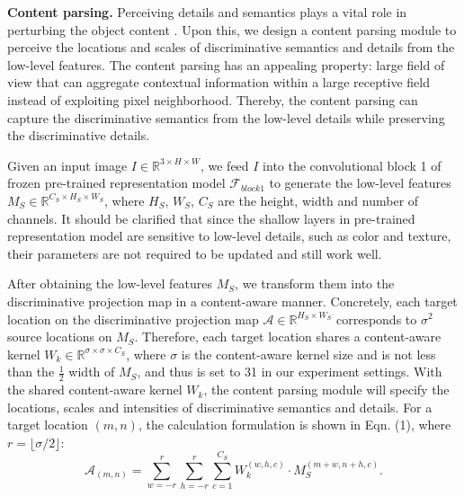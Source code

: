 \documentclass[letterpaper]{article} %
\begin{document}
\textbf{Content parsing.} Perceiving details and semantics plays a vital role in perturbing the object content \cite{DBLP:conf/mm/WangWLO20,DBLP:conf/aaai/WangLWO21, DBLP:conf/icmcs/WangWZLL19}. Upon this, we design a content parsing module to perceive the locations and scales of discriminative semantics and details from the low-level features. The content parsing has an appealing property: large field of view that can aggregate contextual information within a large receptive field instead of exploiting pixel neighborhood. Thereby, the content parsing can capture the discriminative semantics from the low-level details while preserving the discriminative details.


Given an input image $ I \in \mathbb{R}^{3\times H \times W} $, we  feed $ I $ into the convolutional block 1 of frozen pre-trained representation model $ \mathcal{F}_{block1} $ to generate the low-level features $ M_S \in\mathbb{R}^{C_S \times H_S \times W_S} $, where $ H_S $, $W_S $, $ C_S $ are the height, width and number of channels. It should be clarified that since the shallow layers in pre-trained representation model are sensitive to low-level details, such as color and texture, their parameters are not required to be updated and still work well.





After obtaining the low-level features $ M_S $, we transform them into the discriminative projection map in a content-aware manner. Concretely, each target location on the discriminative projection map $ \mathcal{A} \in \mathbb{R}^{H_S \times W_S} $ corresponds to $ \sigma^2 $ source locations on $ M_S $. Therefore, each target location shares a content-aware kernel $ W_k \in \mathbb{R}^{ \sigma \times \sigma \times C_S } $, where $ \sigma $ is the content-aware kernel size and is not less than the $ \frac{1}{2} $ width of $ M_S $, and thus is set to 31 in our experiment settings. With the shared content-aware kernel $ W_k $, the content parsing module will specify the locations, scales and intensities of discriminative semantics and details. For a target location $ (m, n) $, the calculation formulation is shown in Eqn. (1), where $ r = \lfloor \sigma/2\rfloor $:
\begin{equation}
\mathcal{A}_{(m,n)} = \sum_{w=-r}^r\sum_{h=-r}^r \sum_{c=1}^{C_S} W_k^{(w,h,c)} \cdot M_S^{(m+w, n+h,c)}.
\end{equation}
\end{document}
